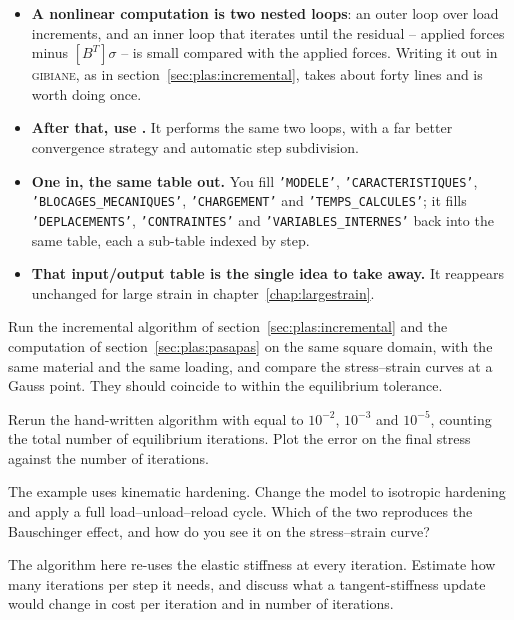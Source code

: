 \begin{gbox*}
\begin{itemize}
  \item \textbf{A nonlinear computation is two nested loops}: an outer loop
  over load increments, and an inner loop that iterates until the residual
  -- applied forces minus $[B^{T}]\sigma$ -- is small compared with the
  applied forces. Writing it out in \textsc{gibiane}, as in
  section~\ref{sec:plas:incremental}, takes about forty lines and is worth
  doing once.
  \item \textbf{After that, use .} It performs the same two
  loops, with a far better convergence strategy and automatic step
  subdivision.
  \item \textbf{One  in, the same table out.} You fill
  \texttt{'MODELE'}, \texttt{'CARACTERISTIQUES'},
  \texttt{'BLOCAGES\_MECANIQUES'}, \texttt{'CHARGEMENT'} and
  \texttt{'TEMPS\_CALCULES'}; it fills \texttt{'DEPLACEMENTS'},
  \texttt{'CONTRAINTES'} and \texttt{'VARIABLES\_INTERNES'} back into the
  same table, each a sub-table indexed by step.
  \item \textbf{That input/output table is the single idea to take away.} It
  reappears unchanged for large strain in
  chapter~\ref{chap:largestrain}.
\end{itemize}
\end{gbox*}


 Run the incremental
  algorithm of section~\ref{sec:plas:incremental} and the  computation of
  section~\ref{sec:plas:pasapas} on the same square domain, with the same
  material and the same loading, and compare the stress--strain curves at a
  Gauss point. They should coincide to within the equilibrium tolerance.

 Rerun the hand-written algorithm with
   equal to $10^{-2}$, $10^{-3}$ and $10^{-5}$, counting the
  total number of equilibrium iterations. Plot the error on the final stress
  against the number of iterations.

 The example uses
  kinematic hardening. Change the model to isotropic hardening and apply a
  full load--unload--reload cycle. Which of the two reproduces the
  Bauschinger effect, and how do you see it on the stress--strain curve?

 The algorithm here
  re-uses the elastic stiffness at every iteration. Estimate how many
  iterations per step it needs, and discuss what a tangent-stiffness update
  would change in cost per iteration and in number of iterations.
